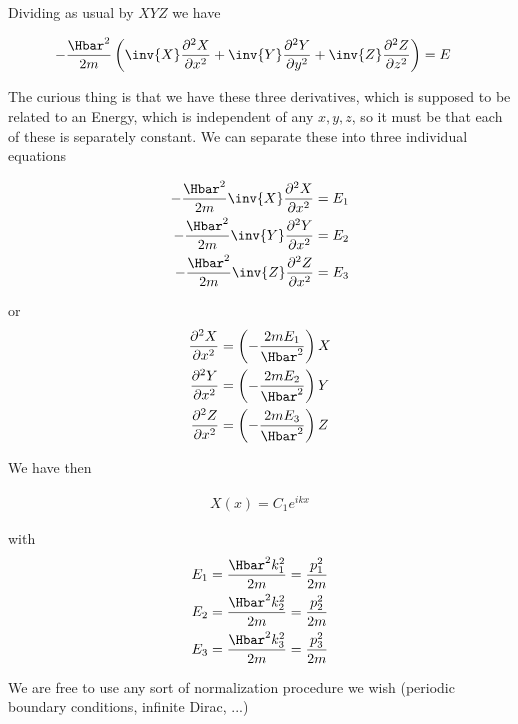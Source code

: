 Dividing as usual by $XYZ$ we have

\begin{equation}\label{eqn:lecture5BigReviewCh4FreeParticle:120}
\begin{aligned}
-\frac{\Hbar^2}{2m} \left(
\inv{X} \frac{\partial^2 X}{\partial {x}^2}
+ \inv{Y} \frac{\partial^2 Y}{\partial {y}^2}
+ \inv{Z} \frac{\partial^2 Z}{\partial {z}^2} \right)
&= E
\end{aligned}
\end{equation}

The curious thing is that we have these three derivatives, which is supposed to be related to an Energy, which is independent of any $x,y,z$, so it must be that each of these is separately constant.  We can separate these into three individual equations

\begin{equation}\label{eqn:lecture5BigReviewCh4FreeParticle:140}
\begin{aligned}
-\frac{\Hbar^2}{2m} \inv{X} \frac{\partial^2 X}{\partial {x}^2} &= E_1 \\
-\frac{\Hbar^2}{2m} \inv{Y} \frac{\partial^2 Y}{\partial {x}^2} &= E_2 \\
-\frac{\Hbar^2}{2m} \inv{Z} \frac{\partial^2 Z}{\partial {x}^2} &= E_3
\end{aligned}
\end{equation}

or
\begin{equation}\label{eqn:lecture5BigReviewCh4FreeParticle:160}
\begin{aligned}
\frac{\partial^2 X}{\partial {x}^2} &= \left( - \frac{2m E_1}{\Hbar^2} \right) X  \\
\frac{\partial^2 Y}{\partial {x}^2} &= \left( - \frac{2m E_2}{\Hbar^2} \right) Y  \\
\frac{\partial^2 Z}{\partial {x}^2} &= \left( - \frac{2m E_3}{\Hbar^2} \right) Z
\end{aligned}
\end{equation}

We have then

\begin{equation}\label{eqn:lecture5BigReviewCh4FreeParticle:180}
\begin{aligned}
X(x) = C_1 e^{i k x}
\end{aligned}
\end{equation}

with
\begin{equation}\label{eqn:lecture5BigReviewCh4FreeParticle:200}
\begin{aligned}
E_1 &= \frac{\Hbar^2 k_1^2 }{2m} = \frac{p_1^2}{2m} \\
E_2 &= \frac{\Hbar^2 k_2^2 }{2m} = \frac{p_2^2}{2m} \\
E_3 &= \frac{\Hbar^2 k_3^2 }{2m} = \frac{p_3^2}{2m}
\end{aligned}
\end{equation}

We are free to use any sort of normalization procedure we wish (periodic boundary conditions, infinite Dirac, ...)

